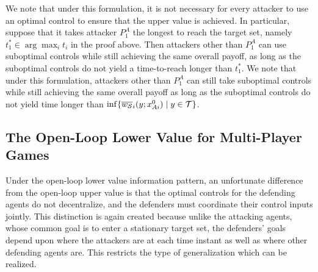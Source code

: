 \begin{rem}
We note that under this formulation, it is not necessary for every attacker to use an optimal control to ensure that the upper value is achieved.  In particular, suppose that it takes attacker $P_1^A$ the longest to reach the target set, namely $t_1^* \in \arg \max_{i} t_i$ in the proof above.  Then attackers other than $P_1^A$ can use suboptimal controls while still achieving the same overall payoff, as long as the suboptimal controls do not yield a time-to-reach longer than $t_1^*$.
We note that under this formulation, attackers other than $P_1^A$ can still take suboptimal controls while still
achieving the same overall payoff as long as the suboptimal controls do not yield time longer than 
$\inf \{\overline{w_{\mathcal{S}}}_{i}(y;x_{Ai}^0) \mid {y\in\mathcal{T}}\}$.
\end{rem}

\subsection{The Open-Loop Lower Value for Multi-Player Games}
Under the open-loop lower value information pattern, an unfortunate difference from the open-loop upper value is that the 
optimal controls for the defending agents do not decentralize, and the defenders must coordinate their control inputs jointly. 
This distinction is again created because unlike the attacking agents, whose common goal is to enter a stationary target set, the defenders' goals depend upon where the attackers are at each time instant as well as where other defending agents are. 
This restricts the type of generalization which can be realized.
 
